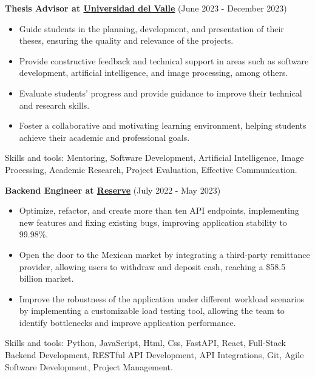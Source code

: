   \vspace*{0.2cm}
  \textbf{Thesis Advisor at \href{https://www.univalle.edu.co/}{Universidad del Valle}} (June 2023 - December 2023)
  \hfill
  \vspace*{0.2cm}
  \begin{minipage}{\linewidth}
    \begin{itemize}[noitemsep]
      \item Guide students in the planning, development, and presentation of their theses, ensuring the quality and relevance of the projects.
      \item Provide constructive feedback and technical support in areas such as software development, artificial intelligence, and image processing, among others.
      \item Evaluate students' progress and provide guidance to improve their technical and research skills.
      \item Foster a collaborative and motivating learning environment, helping students achieve their academic and professional goals.
    \end{itemize}
    \hfill
  \end{minipage}
  Skills and tools: Mentoring, Software Development, Artificial Intelligence, Image Processing, Academic Research, Project Evaluation, Effective Communication.

  \vspace*{0.2cm}
  \textbf{Backend Engineer at \href{https://reserve.org/}{Reserve}} (July 2022 - May 2023)
  \hfill
  \vspace*{0.2cm}
  \begin{minipage}{\linewidth}
    \begin{itemize}[noitemsep]
      \item Optimize, refactor, and create more than ten API endpoints, implementing new features and fixing existing bugs, improving application stability to 99.98\%.
      \item Open the door to the Mexican market by integrating a third-party remittance provider, allowing users to withdraw and deposit cash, reaching a \$58.5 billion market.
      \item Improve the robustness of the application under different workload scenarios by implementing a customizable load testing tool, allowing the team to identify bottlenecks and improve application performance.
    \end{itemize}
    \hfill
  \end{minipage}
  Skills and tools: Python, JavaScript, Html, Css, FastAPI, React, Full-Stack Backend Development, RESTful API Development, API Integrations, Git, Agile Software Development, Project Management.

